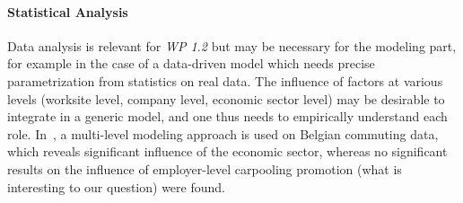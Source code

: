 \paragraph{Statistical Analysis}

Data analysis is relevant for \textit{WP 1.2} but may be necessary for the modeling part, for example in the case of a data-driven model which needs precise parametrization from statistics on real data. The influence of factors at various levels (worksite level, company level, economic sector level) may be desirable to integrate in a generic model, and one thus needs to empirically understand each role. In~\cite{vanoutrive2009carpooling}, a multi-level modeling approach is used on Belgian commuting data, which reveals significant influence of the economic sector, whereas no significant results on the influence of employer-level carpooling promotion (what is interesting to our question) were found.




















